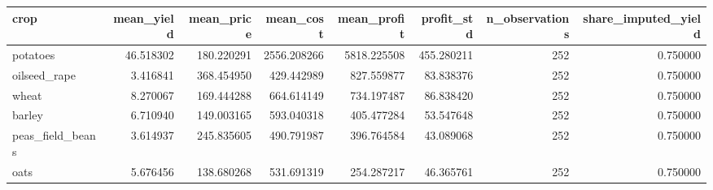 \begin{tabular}{lrrrrrrr}
\toprule
crop & mean\_yield & mean\_price & mean\_cost & mean\_profit & profit\_std & n\_observations & share\_imputed\_yield \\
\midrule
potatoes & 46.518302 & 180.220291 & 2556.208266 & 5818.225508 & 455.280211 & 252 & 0.750000 \\
oilseed\_rape & 3.416841 & 368.454950 & 429.442989 & 827.559877 & 83.838376 & 252 & 0.750000 \\
wheat & 8.270067 & 169.444288 & 664.614149 & 734.197487 & 86.838420 & 252 & 0.750000 \\
barley & 6.710940 & 149.003165 & 593.040318 & 405.477284 & 53.547648 & 252 & 0.750000 \\
peas\_field\_beans & 3.614937 & 245.835605 & 490.791987 & 396.764584 & 43.089068 & 252 & 0.750000 \\
oats & 5.676456 & 138.680268 & 531.691319 & 254.287217 & 46.365761 & 252 & 0.750000 \\
\bottomrule
\end{tabular}
